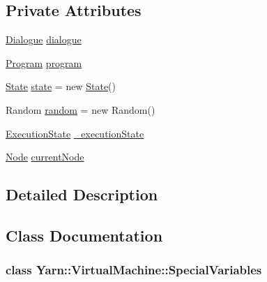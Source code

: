 \subsection*{Private Attributes}
\begin{DoxyCompactItemize}
\item 
\hyperlink{a00070}{Dialogue} \hyperlink{a00136_ac506426c503da5f033247c29e11c5e82}{dialogue}
\item 
\hyperlink{a00124}{Program} \hyperlink{a00136_a2695dbfe3d9df7ffa3f13ad2231217fb}{program}
\item 
\hyperlink{a00139}{State} \hyperlink{a00136_a70f2ce6201cdd2430ceaa764ac614ca0}{state} = new \hyperlink{a00139}{State}()
\item 
Random \hyperlink{a00136_a408485a00c7cc558428c86ed9dd04fca}{random} = new Random()
\item 
\hyperlink{a00136_add28fa9c8a45ca579e84d05920bbc42d}{Execution\-State} \hyperlink{a00136_a0ae362616d85f028b7ec3230388926f4}{\-\_\-execution\-State}
\item 
\hyperlink{a00029_da/de0/a00317}{Node} \hyperlink{a00136_ab7594e14981ad75cecea3b2e7dcf895c}{current\-Node}
\end{DoxyCompactItemize}


\subsection{Detailed Description}


\subsection{Class Documentation}
\label{de/dab/a00319}
\hypertarget{a00136_de/dab/a00319}{}
\subsubsection{class Yarn\-:\-:Virtual\-Machine\-:\-:Special\-Variables}


